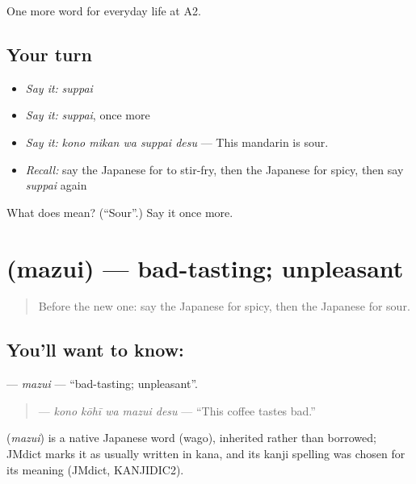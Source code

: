 \begin{grammarlens}[title={What you've built}]
One more word for everyday life at A2.
\end{grammarlens}

\subsection*{Your turn}
\begin{itemize}
\raggedright
  \item \emph{Say it:} \emph{suppai}
  \item \emph{Say it:} \emph{suppai}, once more
  \item \emph{Say it:} \emph{kono mikan wa suppai desu} — This mandarin is sour.
  \item \emph{Recall:} say the Japanese for to stir-fry, then the Japanese for spicy, then say \emph{suppai} again
\end{itemize}

\begin{tcolorbox}[breakable,colback=teal!4,colframe=teal!35!black,title={Before you move on}]
What does  mean? (\textquotedblleft{}Sour\textquotedblright{}.) Say it once more.
\end{tcolorbox}
\section[\texorpdfstring{\ja{まずい} (mazui)}{まずい (mazui)}]{ (mazui) — bad-tasting; unpleasant}

\label{lesson:JA-C177-mazui}



\begin{quote}
Before the new one: say the Japanese for spicy, then the Japanese for sour.
\end{quote}

\subsection*{You'll want to know: }
\textbf{} — \emph{mazui} — \textquotedblleft{}bad-tasting; unpleasant\textquotedblright{}.

\begin{quote}
\textbf{  } — \emph{kono kōhī wa mazui desu} — \textquotedblleft{}This coffee tastes bad.\textquotedblright{}
\end{quote}

\begin{cousinweb}
\textbf{} (\emph{mazui}) is a native Japanese word (wago), inherited rather than borrowed; JMdict marks it as usually written in kana, and its kanji spelling was chosen for its meaning (JMdict, KANJIDIC2).
\end{cousinweb}

